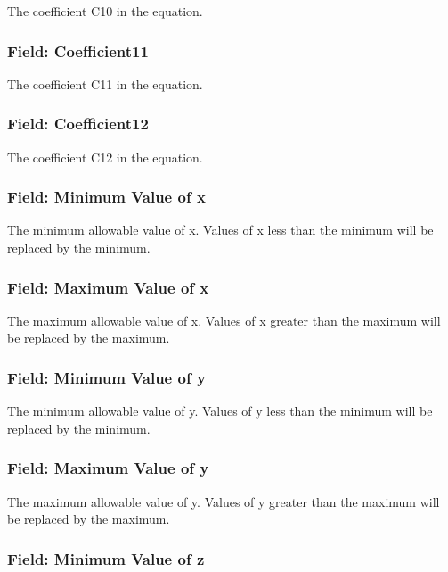 The coefficient C10 in the equation.

\subsubsection{Field: Coefficient11}\label{field-coefficient11}

The coefficient C11 in the equation.

\subsubsection{Field: Coefficient12}\label{field-coefficient12}

The coefficient C12 in the equation.

\subsubsection{Field: Minimum Value of x}\label{field-minimum-value-of-x-9}

The minimum allowable value of x. Values of x less than the minimum will be replaced by the minimum.

\subsubsection{Field: Maximum Value of x}\label{field-maximum-value-of-x-10}

The maximum allowable value of x. Values of x greater than the maximum will be replaced by the maximum.

\subsubsection{Field: Minimum Value of y}\label{field-minimum-value-of-y-4}

The minimum allowable value of y. Values of y less than the minimum will be replaced by the minimum.

\subsubsection{Field: Maximum Value of y}\label{field-maximum-value-of-y-4}

The maximum allowable value of y. Values of y greater than the maximum will be replaced by the maximum.

\subsubsection{Field: Minimum Value of z}\label{field-minimum-value-of-z-1}

